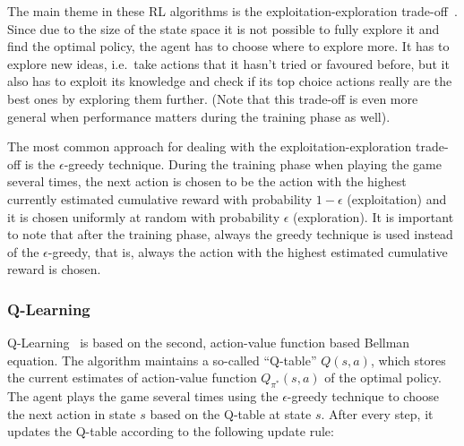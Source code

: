The main theme in these RL algorithms is the exploitation-exploration trade-off~\cite{kaelbling1996explorationexploitation}. Since due to the size of the state space it is not possible to fully explore it and find the optimal policy, the agent has to choose where to explore more. It has to explore new ideas, i.e.\ take actions that it hasn't tried or favoured before, but it also has to exploit its knowledge and check if its top choice actions really are the best ones by exploring them further. (Note that this trade-off is even more general when performance matters during the training phase as well).

The most common approach for dealing with the exploitation-exploration trade-off is the $\epsilon$-greedy technique. During the training phase when playing the game several times, the next action is chosen to be the action with the highest currently estimated cumulative reward with probability $1-\epsilon$ (exploitation) and it is chosen uniformly at random with probability $\epsilon$ (exploration). It is important to note that after the training phase, always the greedy technique is used instead of the $\epsilon$-greedy, that is, always the action with the highest estimated cumulative reward is chosen.



\subsubsection{Q-Learning}


Q-Learning~\cite{watkins1989qlearning} is based on the second, action-value function based Bellman equation. The algorithm maintains a so-called ``Q-table'' $Q(s,a)$, which stores the current estimates of action-value function $Q_{\pi^*}(s,a)$ of the optimal policy. The agent plays the game several times using the $\epsilon$-greedy technique to choose the next action in state $s$ based on the Q-table at state $s$. After every step, it updates the Q-table according to the following update rule:

